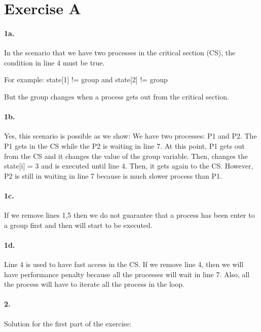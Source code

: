 \section*{Exercise A}

\paragraph{1a.}
In the scenario that we have two processes in the critical section (CS), 
the condition in line 4 must be true.

For example: state[1] != group and state[2] != group

But the group changes when a process gets out from the critical
section.

\paragraph{1b.}
Yes, this scenario is possible as we show:
We have two processes: P1 and P2. The P1 gets in the CS while the P2
is waiting in line 7. At this point, P1 gets out from the CS and it
changes the value of the group variable. Then, changes the state[i] =
3 and is executed until line 4. Then, it gets again to the CS.
However, P2 is still in waiting in line 7 because is much slower
process than P1.

\paragraph{1c.}
If we remove lines 1,5 then we do not guarantee that a process has
been enter to a group first and then will start to be executed.

\paragraph{1d.}
Line 4 is used to have fast access in the CS. If we remove line 4,
then we will have performance penalty because all the processes will
wait in line 7. Also, all the process will have to iterate all the
process in the loop.

\paragraph{2.}
Solution for the first part of the exercise:


